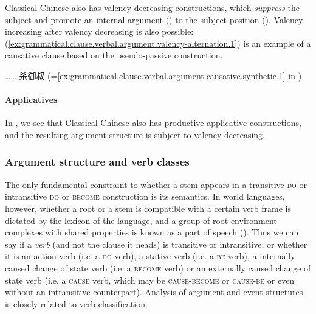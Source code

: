 \documentclass[UTF8, a4paper, oneside, scheme=plain, 12pt]{ctexrep}
\newcommand*{\category}[1]{\textsc{#1}}
\begin{document}
Classical Chinese also has valency decreasing constructions, which \emph{suppress} the subject 
and promote an internal argument () to the subject position ().
Valency increasing after valency decreasing is also possible:
(\ref{ex:grammatical.clause.verbal.argument.valency-alternation.1})
is an example of a causative clause based on the pseudo-passive construction.

\begin{exe}
    \ex\label{ex:grammatical.clause.verbal.argument.valency-alternation.1} …… 杀御叔 (=\ref{ex:grammatical.clause.verbal.argument.causative.synthetic.1} in )
\end{exe}

\paragraph{Applicatives}

In ,
we see that Classical Chinese also has productive applicative constructions,
and the resulting argument structure is subject to valency decreasing.



\subsubsection{Argument structure and verb classes}\label{sec:grammatical.clause.argument.lexical}

The only fundamental constraint to whether a stem appears in a transitive \category{do} or intransitive \category{do} or \category{become} construction is its semantics.
In world languages, however, whether a root or a stem is compatible with a certain verb frame
is dictated by the lexicon of the language,
and a group of root-environment complexes with shared properties 
is known as a part of speech ().
Thus we can say if a \emph{verb} (and not the clause it heads) is transitive or intransitive,
or whether it is an action verb (i.e. a \category{do} verb),
a stative verb (i.e. a \category{be} verb),
a internally caused change of state verb (i.e. a \category{become} verb)
or an externally caused change of state verb (i.e. a \category{cause} verb,
which may be \category{cause}-\category{become} or \category{cause}-\category{be}
or even without an intransitive counterpart).
Analysis of argument and event structures is closely related to verb classification.
\end{document}
